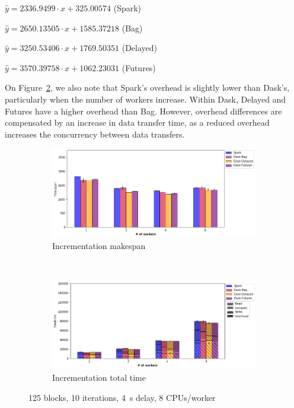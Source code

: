 \documentclass[conference]{IEEEtran}
\begin{document}
\hspace{1cm}\(\hat{y}=2336.9499\cdot{x} + 325.00574\) (Spark)

\hspace{1cm}\(\hat{y}=2650.13505\cdot{x} + 1585.37218\) (Bag)

\hspace{1cm}\(\hat{y}=3250.53406\cdot{x} + 1769.50351\) (Delayed)

\hspace{1cm}\(\hat{y}=3570.39758\cdot{x} + 1062.23031\) (Futures)

On Figure~\ref{fig:inc_tt_worker}, we also note that Spark's overhead is
slightly lower than Dask's, particularly when the number of workers increase.
Within Dask, Delayed and Futures have a higher overhead than Bag. However,
overhead differences are compensated by an increase in data transfer time,
as a reduced overhead increases the concurrency between data transfers. 

\begin{figure}[!b]
    \centering
    \begin{subfigure}[b]{\columnwidth}
        \includegraphics[clip,width=\columnwidth]{images/inc_worker.png}%
        \caption{Incrementation makespan}\label{fig:inc_ms_worker}
    \end{subfigure}
    \\
    \begin{subfigure}[b]{\columnwidth}
        \includegraphics[clip,width=\columnwidth]{images/inc_idle_worker.png}%
        \caption{Incrementation total time}\label{fig:inc_tt_worker}
    \end{subfigure}
    \caption{125 blocks, 10 iterations, \SI{4}{\second} delay, 8
    CPUs/worker}\label{fig:inc_worker}
\end{figure}
\end{document}
